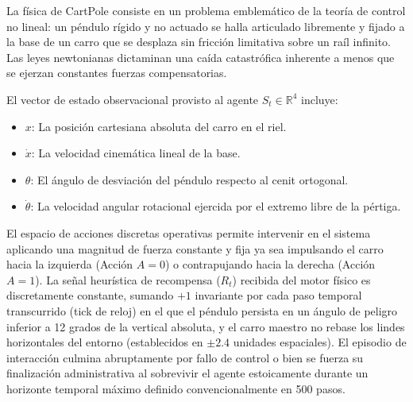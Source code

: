 \documentclass[a4paper,12pt,twocolumn]{article}
\begin{document}
La física de CartPole consiste en un problema emblemático de la teoría de control no lineal: un péndulo rígido y no actuado se halla articulado libremente y fijado a la base de un carro que se desplaza sin fricción limitativa sobre un raíl infinito. Las leyes newtonianas dictaminan una caída catastrófica inherente a menos que se ejerzan constantes fuerzas compensatorias.

El vector de estado observacional provisto al agente $S_t \in \mathbb{R}^4$ incluye:
\begin{itemize}
    \item $x$: La posición cartesiana absoluta del carro en el riel.
    \item $\dot{x}$: La velocidad cinemática lineal de la base.
    \item $\theta$: El ángulo de desviación del péndulo respecto al cenit ortogonal.
    \item $\dot{\theta}$: La velocidad angular rotacional ejercida por el extremo libre de la pértiga.
\end{itemize}
El espacio de acciones discretas operativas permite intervenir en el sistema aplicando una magnitud de fuerza constante y fija ya sea impulsando el carro hacia la izquierda (Acción $A=0$) o contrapujando hacia la derecha (Acción $A=1$). La señal heurística de recompensa ($R_t$) recibida del motor físico es discretamente constante, sumando $+1$ invariante por cada paso temporal transcurrido (tick de reloj) en el que el péndulo persista en un ángulo de peligro inferior a 12 grados de la vertical absoluta, y el carro maestro no rebase los lindes horizontales del entorno (establecidos en $\pm 2.4$ unidades espaciales). El episodio de interacción culmina abruptamente por fallo de control o bien se fuerza su finalización administrativa al sobrevivir el agente estoicamente durante un horizonte temporal máximo definido convencionalmente en 500 pasos.
\end{document}
